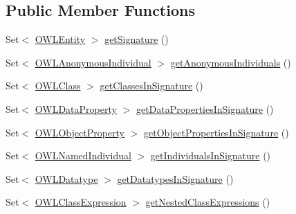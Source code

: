 \subsection*{Public Member Functions}
\begin{DoxyCompactItemize}
\item 
Set$<$ \hyperlink{interfaceorg_1_1semanticweb_1_1owlapi_1_1model_1_1_o_w_l_entity}{O\-W\-L\-Entity} $>$ \hyperlink{interfaceorg_1_1semanticweb_1_1owlapi_1_1model_1_1_o_w_l_object_acb9cc88dda5fddf752aea39972e88582}{get\-Signature} ()
\item 
Set$<$ \hyperlink{interfaceorg_1_1semanticweb_1_1owlapi_1_1model_1_1_o_w_l_anonymous_individual}{O\-W\-L\-Anonymous\-Individual} $>$ \hyperlink{interfaceorg_1_1semanticweb_1_1owlapi_1_1model_1_1_o_w_l_object_aeb25a1500c84b42d5eca3ce94029815b}{get\-Anonymous\-Individuals} ()
\item 
Set$<$ \hyperlink{interfaceorg_1_1semanticweb_1_1owlapi_1_1model_1_1_o_w_l_class}{O\-W\-L\-Class} $>$ \hyperlink{interfaceorg_1_1semanticweb_1_1owlapi_1_1model_1_1_o_w_l_object_acef2cee5936b52f888f1c9b5310ecf28}{get\-Classes\-In\-Signature} ()
\item 
Set$<$ \hyperlink{interfaceorg_1_1semanticweb_1_1owlapi_1_1model_1_1_o_w_l_data_property}{O\-W\-L\-Data\-Property} $>$ \hyperlink{interfaceorg_1_1semanticweb_1_1owlapi_1_1model_1_1_o_w_l_object_a63bdba262086d66ac82db881882acb7a}{get\-Data\-Properties\-In\-Signature} ()
\item 
Set$<$ \hyperlink{interfaceorg_1_1semanticweb_1_1owlapi_1_1model_1_1_o_w_l_object_property}{O\-W\-L\-Object\-Property} $>$ \hyperlink{interfaceorg_1_1semanticweb_1_1owlapi_1_1model_1_1_o_w_l_object_aa6016f7a4b9d773637cc7320bbcd518a}{get\-Object\-Properties\-In\-Signature} ()
\item 
Set$<$ \hyperlink{interfaceorg_1_1semanticweb_1_1owlapi_1_1model_1_1_o_w_l_named_individual}{O\-W\-L\-Named\-Individual} $>$ \hyperlink{interfaceorg_1_1semanticweb_1_1owlapi_1_1model_1_1_o_w_l_object_a469d86935b296905f4ec7089fb10f35f}{get\-Individuals\-In\-Signature} ()
\item 
Set$<$ \hyperlink{interfaceorg_1_1semanticweb_1_1owlapi_1_1model_1_1_o_w_l_datatype}{O\-W\-L\-Datatype} $>$ \hyperlink{interfaceorg_1_1semanticweb_1_1owlapi_1_1model_1_1_o_w_l_object_a0070f97659c74d4bcfb177e37c8fd427}{get\-Datatypes\-In\-Signature} ()
\item 
Set$<$ \hyperlink{interfaceorg_1_1semanticweb_1_1owlapi_1_1model_1_1_o_w_l_class_expression}{O\-W\-L\-Class\-Expression} $>$ \hyperlink{interfaceorg_1_1semanticweb_1_1owlapi_1_1model_1_1_o_w_l_object_a6b27084110880692de591ad7b32e105b}{get\-Nested\-Class\-Expressions} ()

\end{DoxyCompactItemize}

